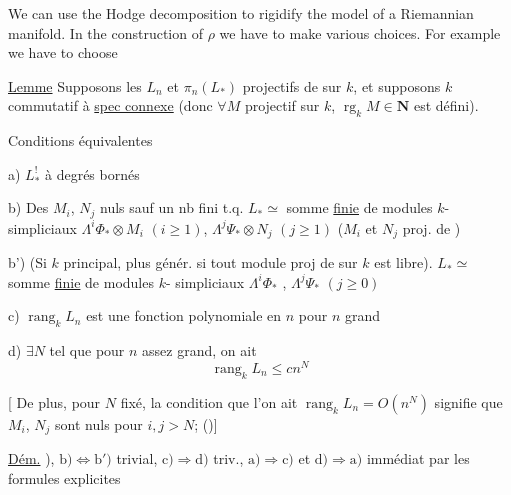 We can use the Hodge decomposition to rigidify the
model of a Riemannian manifold. In the construction of
$\rho$
we have to make various choices. For example we have to
choose

\uline{Lemme} Supposons les $L_n$ et $\pi_n(L_*)$
projectifs de  sur $k$, et supposons $k$
commutatif à \uline{spec connexe} (donc
$\forall M$ projectif sur $k$, $\operatorname{rg}_k M\in\mathbf N$ est défini).

Conditions équivalentes

a) $L^!_*$ à degrés bornés

b)  Des $M_i$, $N_j$  nuls sauf
un nb fini t.q. $L_*\simeq$ somme \uline{finie}
de modules $k$-simpliciaux $\Lambda^i\Phi_*\otimes M_i$ $(i\geq1)$,
$\Lambda^j\Psi_*\otimes N_j$ $(j\geq1)$ ($M_i$ et $N_j$ proj. de )

b') (Si $k$ principal, plus génér. si tout
module proj de  sur $k$ est libre).
$L_*\simeq$ somme \uline{finie} de modules $k$-
simpliciaux $\Lambda^i\Phi_*$ , $\Lambda^j\Psi_*$ $(j\geq0)$

c) $\operatorname{rang}_k L_n$ est une fonction
polynomiale en $n$ pour $n$ grand

d) $\exists N$  tel que pour $n$ assez
grand, on ait
\[
\operatorname{rang}_k L_n\leq c n^N
\]

[ De plus,  pour $N$ fixé, la condition
que l'on ait $\operatorname{rang}_k L_n=O(n^N)$
signifie que $M_i$, $N_j$ sont nuls pour $i,j>N$;
 
()]

\uline{Dém.} 
), $\mathrm b)\Longleftrightarrow\mathrm b')$ trivial,
$\mathrm c)\Rightarrow\mathrm d)$ triv., $\mathrm a)\Rightarrow\mathrm c)$ et $\mathrm d)\Rightarrow\mathrm a)$
immédiat par les formules explicites

